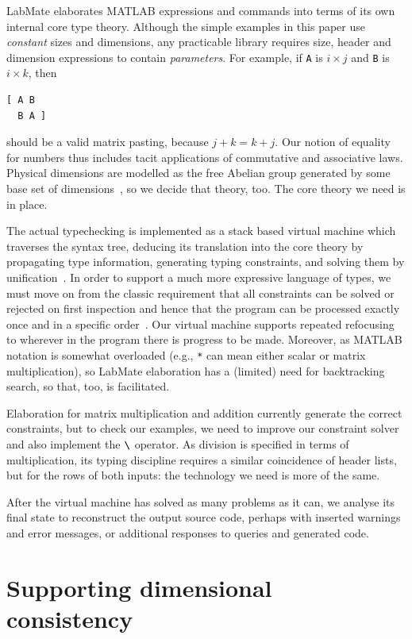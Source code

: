\documentclass{IMEKO2024}
\newcommand{\bsl}{\texttt{\symbol{92}}}
\begin{document}
LabMate elaborates MATLAB expressions and commands into terms of its own internal core type theory.
%
Although the simple examples in this paper use \emph{constant} sizes and dimensions, any practicable library requires size, header and dimension expressions to contain \emph{parameters}.
%
For example, if \texttt{A} is $i\times j$ and \texttt{B} is $i\times k$, then
\begin{verbatim}
[ A B
  B A ]
\end{verbatim}
should be a valid matrix pasting, because $j+k = k+j$. Our notion of equality for numbers thus includes tacit applications of commutative and associative laws. %
%
Physical dimensions are modelled as the free Abelian group generated by some base set of dimensions~\cite{dim.group}, so we decide that theory, too.
%
The core theory we need is in place.

The actual typechecking is implemented as a stack based virtual machine which traverses the syntax tree, deducing its translation into the core theory by propagating type information, generating typing constraints, and solving them by unification~\cite{robinson65}.
%
In order to support a much more expressive language of types, we must move on from the classic requirement that all constraints can be solved or rejected on first inspection and hence that the program can be processed exactly once and in a specific order~\cite{damas.milner}.
%
Our virtual machine supports repeated refocusing to wherever in the program there is progress to be made.
%
Moreover, as MATLAB notation is somewhat overloaded (e.g., \texttt{*} can mean either scalar or matrix multiplication), so LabMate elaboration has a (limited) need for backtracking search, so that, too, is facilitated.

Elaboration for matrix multiplication and addition currently generate the correct constraints, but to check our examples, we need to improve our constraint solver and also implement the $\bsl$ operator.
%
As division is specified in terms of multiplication, its typing discipline requires a similar coincidence of header lists, but for the rows of both inputs: the technology we need is more of the same.

After the virtual machine has solved as many problems as it can, we analyse its final state to reconstruct the output source code, perhaps with inserted warnings and error messages, or additional responses to queries and generated code.

\section{Supporting dimensional consistency}
\label{sec:example-revisited}
\end{document}
